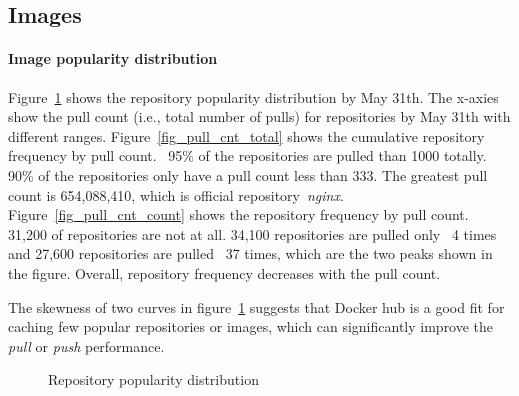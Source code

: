\subsection{Images}
\label{sec:images}

\paragraph{Image popularity distribution}

Figure~\ref{fig-pop} shows the repository popularity distribution by May 31th. The x-axies show the pull count (i.e., total number of pulls) for repositories by May 31th with different ranges.
Figure~\ref{fig_pull_cnt_total} shows the cumulative repository frequency by pull count. ~95\% of the repositories are pulled than 1000 totally. 90\% of the repositories only have a pull count less than 333. The greatest pull count is 654,088,410, which is official repository~\textit{nginx}. 
Figure~\ref{fig_pull_cnt_count} shows the repository frequency by pull count. 31,200 of repositories are not at all.  
34,100 repositories are pulled only ~4 times and 27,600 repositories are pulled ~37 times, which are the two peaks shown in the figure.
Overall, repository frequency decreases with the pull count.

The skewness of two curves in figure~\ref{fig-pop} suggests that Docker hub is a good fit for caching few popular repositories or images, which can significantly improve the \textit{pull} or \textit{push} performance.      

\begin{figure}[!t]
	\centering
	\caption{Repository popularity distribution}
	\label{fig-pop}
\end{figure}

